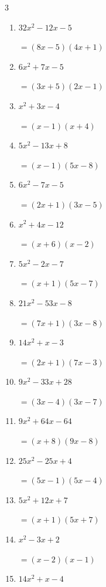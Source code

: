 \begin{multicols}{3}
\begin{enumerate}
\columnbreak %

\resetques

  \item $32x^{2}-12x-5$

        $=(8x-5)(4x+1)$

  \item $6x^{2}+7x-5$

        $=(3x+5)(2x-1)$

  \item $x^{2}+3x-4$

        $=(x-1)(x+4)$

  \item $5x^{2}-13x+8$

        $=(x-1)(5x-8)$

  \item $6x^{2}-7x-5$

        $=(2x+1)(3x-5)$

  \item $x^{2}+4x-12$

        $=(x+6)(x-2)$

  \item $5x^{2}-2x-7$

        $=(x+1)(5x-7)$

  \item $21x^{2}-53x-8$

        $=(7x+1)(3x-8)$

  \item $14x^{2}+x-3$

        $=(2x+1)(7x-3)$

  \item $9x^{2}-33x+28$

        $=(3x-4)(3x-7)$

\columnbreak %

  \item $9x^{2}+64x-64$

        $=(x+8)(9x-8)$

  \item $25x^{2}-25x+4$

        $=(5x-1)(5x-4)$

  \item $5x^{2}+12x+7$

        $=(x+1)(5x+7)$

  \item $x^{2}-3x+2$

        $=(x-2)(x-1)$

  \item $14x^{2}+x-4$


\end{enumerate}
\end{multicols}
